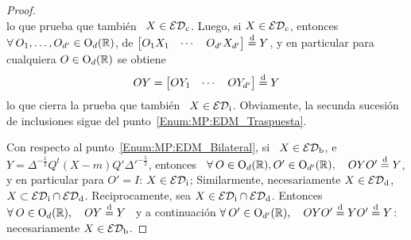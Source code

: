 \begin{proof}
\[  \]
  lo que prueba  que tambi\'en \ $X \in \mathcal{ED}_{\mathrm{c}}$.  Luego,  si $X \in \mathcal{ED}_{\mathrm{c}}$,
  entonces  \  $\forall  \:  O_1  ,  \ldots  ,  O_{d'}  \in  \mathrm{O}_d(\mathbb{R})$,  de
  $\begin{bmatrix} O_1 X_1  & \cdots & O_{d'} X_{d'}  \end{bmatrix} \stackrel{\mathrm{d}}{=} Y$, y
  en particular para cualquiera $O \in \mathrm{O}_d(\mathbb{R})$ se obtiene
  \[
  O Y = \begin{bmatrix} O Y_1 & \cdots & O Y_{d'} \end{bmatrix} \stackrel{\mathrm{d}}{=} Y
  \]
  lo que  cierra la  prueba que  tambi\'en \ $X  \in \mathcal{ED}_{\mathrm{i}}$.   Obviamente, la
  secunda        sucesi\'on        de        inclusiones        sigue        del
  punto~\ref{Enum:MP:EDM_Traspuesta}.


  Con respecto al punto~\ref{Enum:MP:EDM_Bilateral}, si  \ $X \in \mathcal{ED}_{\mathrm{b}}$, e \
  $Y =  \Delta^{-\frac12} Q^t (X-m) Q' \Delta'^{-\frac12}$,  entonces \ $\forall
  \: O \in \mathrm{O}_d(\mathbb{R}), O' \in \mathrm{O}_{d'}(\mathbb{R}),  \quad O Y O' \stackrel{\mathrm{d}}{=} Y$, y en
  particular para  $O' = I$:  $X \in \mathcal{ED}_{\mathrm{i}}$; Similarmente,  necesariamente $X
  \in \mathcal{ED}_{\mathrm{d}}$, \ie $X \subset \mathcal{ED}_{\mathrm{i}} \cap \mathcal{ED}_{\mathrm{d}}$.  Reciprocamente, sea $X
  \in \mathcal{ED}_{\mathrm{i}} \cap \mathcal{ED}_{\mathrm{d}}$.  Entonces  $\forall \: O \in \mathrm{O}_d(\mathbb{R}), \quad
  O Y \stackrel{\mathrm{d}}{=} Y$ \ y  a continuaci\'on $\forall \: O' \in \mathrm{O}_{d'}(\mathbb{R}), \quad
  O Y O' \stackrel{\mathrm{d}}{=} Y O' \stackrel{\mathrm{d}}{=} Y$: necesariamente $X \in \mathcal{ED}_{\mathrm{b}}$.


\end{proof}
